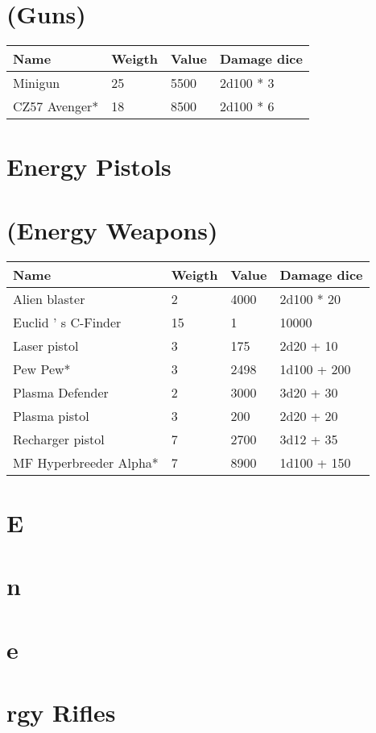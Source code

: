 \documentclass{report}
\begin{document}
\begin{table}[H]
\begin{table}[H]
\begin{table}[H]
\begin{table}[H]
\chapter{(Guns)}
\begin{table}[H]
  \centering
  \begin{tabular}{p{30mm}p{30mm}p{30mm}p{30mm}}
\bfseries Name & \bfseries Weigth & \bfseries Value & \bfseries Damage dice \\
\hline
Minigun  & 25 & 5500 & 2d100 *  3 \\
CZ57 Avenger*  & 18 & 8500 & 2d100 *  6 \\
  \end{tabular}
\chapter{Energy Pistols }
\chapter{(Energy Weapons)}
\begin{table}[H]
  \centering
  \begin{tabular}{p{30mm}p{30mm}p{30mm}p{30mm}}
\bfseries Name & \bfseries Weigth & \bfseries Value & \bfseries Damage dice \\
\hline
Alien blaster  & 2 & 4000 & 2d100 * 20 \\
Euclid ' s C-Finder  & 15 & 1 & 10000 \\
Laser pistol & 3 & 175 & 2d20 +  10 \\
Pew Pew*  & 3 & 2498 & 1d100 + 200 \\
Plasma Defender & 2 & 3000 & 3d20 + 30 \\
Plasma pistol & 3 & 200 & 2d20 + 20 \\
Recharger pistol  & 7 & 2700 & 3d12 + 35 \\
MF Hyperbreeder Alpha*  & 7 & 8900 & 1d100 + 150 \\
  \end{tabular}
\chapter{E}
\chapter{n}
\chapter{e}
\chapter{rgy Rifles }

\end{table}
\end{table}
\end{table}
\end{table}
\end{table}
\end{table}
\end{document}
